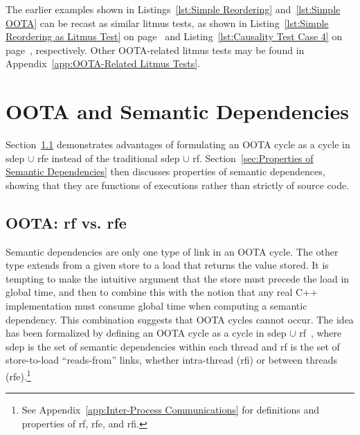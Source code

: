 \documentclass[10]{article}
\begin{document}
The earlier examples shown in
Listings~\ref{lst:Simple Reordering}
and~\ref{lst:Simple OOTA}
can be recast as similar  litmus tests, as shown in
Listing~\ref{lst:Simple Reordering as Litmus Test}
on page~\pageref{lst:Simple Reordering as Litmus Test}
and Listing~\ref{lst:Causality Test Case 4}
on page~\pageref{lst:Causality Test Case 4}, respectively.
Other OOTA-related litmus tests may be found in
Appendix~\ref{app:OOTA-Related Litmus Tests}.

\section{OOTA and Semantic Dependencies}
\label{sec:OOTA and Semantic Dependencies}

Section~\ref{sec:OOTA: rf vs. rfe}
demonstrates advantages of formulating an OOTA cycle as a cycle in
sdep $\cup$ rfe instead of the traditional sdep $\cup$ rf.
Section~\ref{sec:Properties of Semantic Dependencies}
then discusses properties of semantic dependences, showing that they
are functions of executions rather than strictly of source code.

\subsection{OOTA: rf vs. rfe}
\label{sec:OOTA: rf vs. rfe}

Semantic dependencies are only one type of link in an OOTA cycle.
The other type extends from a given store to a load that returns the
value stored.
It is tempting to make the intuitive argument that the store must precede
the load in global time, and then to combine this with the notion that
any real C++ implementation must consume global time when computing a
semantic dependency.
This combination suggests that OOTA cycles cannot occur.
The idea has been formalized by defining an OOTA cycle as a cycle
in sdep $\cup$ rf~\cite{PaulEMcKenney2014OOTA},
where sdep is the set of semantic dependencies within
each thread and rf is the set of store-to-load ``reads-from'' links,
whether intra-thread
(rfi) or between threads (rfe).\footnote{
	See Appendix~\ref{app:Inter-Process Communications} for definitions
	and properties of rf, rfe, and rfi.}
\end{document}

